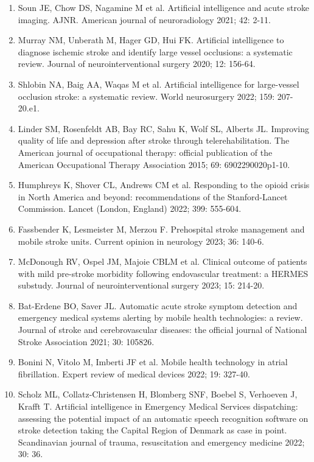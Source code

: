 {{\small
\begin{enumerate}
    \item Soun JE, Chow DS, Nagamine M et al. Artificial intelligence and acute stroke imaging. AJNR. American journal of neuroradiology 2021; 42: 2-11.
    \item Murray NM, Unberath M, Hager GD, Hui FK. Artificial intelligence to diagnose ischemic stroke and identify large vessel occlusions: a systematic review. Journal of neurointerventional surgery 2020; 12: 156-64.
    \item Shlobin NA, Baig AA, Waqas M et al. Artificial intelligence for large-vessel occlusion stroke: a systematic review. World neurosurgery 2022; 159: 207-20.e1.
    \item Linder SM, Rosenfeldt AB, Bay RC, Sahu K, Wolf SL, Alberts JL. Improving quality of life and depression after stroke through telerehabilitation. The American journal of occupational therapy: official publication of the American Occupational Therapy Association 2015; 69: 6902290020p1-10.
    \item Humphreys K, Shover CL, Andrews CM et al. Responding to the opioid crisis in North America and beyond: recommendations of the Stanford-Lancet Commission. Lancet (London, England) 2022; 399: 555-604.
    \item Fassbender K, Lesmeister M, Merzou F. Prehospital stroke management and mobile stroke units. Current opinion in neurology 2023; 36: 140-6.
    \item McDonough RV, Ospel JM, Majoie CBLM et al. Clinical outcome of patients with mild pre-stroke morbidity following endovascular treatment: a HERMES substudy. Journal of neurointerventional surgery 2023; 15: 214-20.
    \item Bat-Erdene BO, Saver JL. Automatic acute stroke symptom detection and emergency medical systems alerting by mobile health technologies: a review. Journal of stroke and cerebrovascular diseases: the official journal of National Stroke Association 2021; 30: 105826.
    \item Bonini N, Vitolo M, Imberti JF et al. Mobile health technology in atrial fibrillation. Expert review of medical devices 2022; 19: 327-40.
    \item Scholz ML, Collatz-Christensen H, Blomberg SNF, Boebel S, Verhoeven J, Krafft T. Artificial intelligence in Emergency Medical Services dispatching: assessing the potential impact of an automatic speech recognition software on stroke detection taking the Capital Region of Denmark as case in point. Scandinavian journal of trauma, resuscitation and emergency medicine 2022; 30: 36.

\end{enumerate}}}
